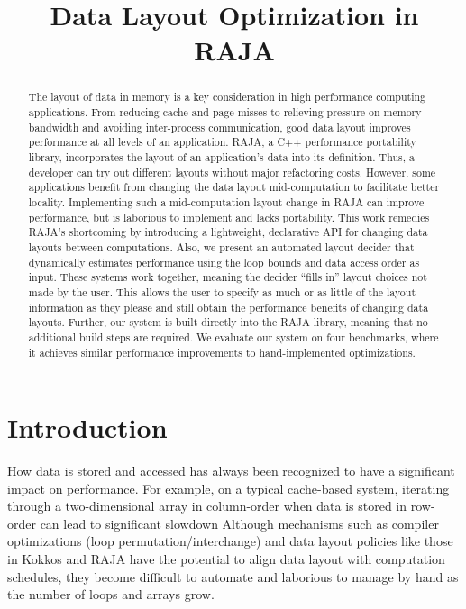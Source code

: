\documentclass[sigconf]{acmart}
\title{Data Layout Optimization in RAJA}
\begin{document}
\begin{abstract}

The layout of data in memory is a key consideration in high performance computing applications.
From reducing cache and page misses to relieving pressure on memory bandwidth and avoiding inter-process communication, good data layout improves performance at all levels of an application.
RAJA, a C++ performance portability library, incorporates the layout of an application's data into its definition.
Thus, a developer can try out different layouts without major refactoring costs.
However, some applications benefit from changing the data layout mid-computation to facilitate better locality.
Implementing such a mid-computation layout change in RAJA can improve performance, but is laborious to implement and lacks portability.
This work remedies RAJA's shortcoming by introducing a lightweight, declarative API for changing data layouts between computations.
Also, we present an automated layout decider that dynamically estimates performance using the loop bounds and data access order as input. 
These systems work together, meaning the decider \enquote{fills in} layout choices not made by the user.
This allows the user to specify as much or as little of the layout information as they please and still obtain the performance benefits of changing data layouts.  
Further, our system is built directly into the RAJA library, meaning that no additional build steps are required.
We evaluate our system on four benchmarks, where it achieves similar performance improvements to hand-implemented optimizations.
\end{abstract}
\maketitle
\def\@textbottom{\vskip \z@ \@plus 1pt}




\section{Introduction}

How data is stored and accessed has always been recognized to have a significant impact on performance. 
For example, on a typical cache-based system, iterating through a two-dimensional array in column-order when data is 
stored in row-order can lead to significant slowdown 
Although mechanisms such as compiler optimizations (loop permutation/interchange) 
and data layout policies like those in Kokkos \cite{edwards2014kokkos} and RAJA \cite{hornung2014RAJA} have the potential to align data layout with computation schedules, they become difficult to automate and laborious to manage by hand as the number of loops and arrays grow.
\end{document}

